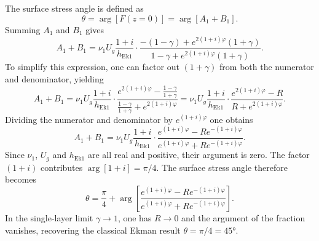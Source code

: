 The surface stress angle is defined as
\begin{equation}
    \theta = \arg\left[F(z=0)\right] = \arg\left[A_1+B_1\right].
\end{equation}
Summing $A_1$ and $B_1$ gives
\begin{equation}
    A_1+B_1 = \nu_1 U_g\frac{1+i}{h_\text{Ek1}}\cdot\frac{-(1-\gamma)+e^{2(1+i)\varphi}(1+\gamma)}{1-\gamma+e^{2(1+i)\varphi}(1+\gamma)}.
\end{equation}
To simplify this expression, one can factor out $(1+\gamma)$ from both the numerator and denominator, yielding
\begin{equation}
    A_1+B_1 = \nu_1 U_g\frac{1+i}{h_\text{Ek1}}\cdot\frac{e^{2(1+i)\varphi}-\frac{1-\gamma}{1+\gamma}}{\frac{1-\gamma}{1+\gamma}+e^{2(1+i)\varphi}} = \nu_1 U_g\frac{1+i}{h_\text{Ek1}}\cdot\frac{e^{2(1+i)\varphi}-R}{R+e^{2(1+i)\varphi}}.
\end{equation}
Dividing the numerator and denominator by $e^{(1+i)\varphi}$ one obtains
\begin{equation}
    A_1+B_1 = \nu_1 U_g\frac{1+i}{h_\text{Ek1}}\cdot\frac{e^{(1+i)\varphi}-Re^{-(1+i)\varphi}}{e^{(1+i)\varphi}+Re^{-(1+i)\varphi}}.
\end{equation}
Since $\nu_1$, $U_g$ and $h_\text{Ek1}$ are all real and positive, their argument is zero. The factor $(1+i)$ contributes $\arg[1+i]=\pi/4$. The surface stress angle therefore becomes
\begin{equation}
    \theta = \frac{\pi}{4} + \arg\left[\frac{e^{(1+i)\varphi}-Re^{-(1+i)\varphi}}{e^{(1+i)\varphi}+Re^{-(1+i)\varphi}}\right].
\end{equation}
In the single-layer limit $\gamma\rightarrow 1$, one has $R\rightarrow 0$ and the argument of the fraction vanishes, recovering the classical Ekman result $\theta=\pi/4=\ang{45}$.